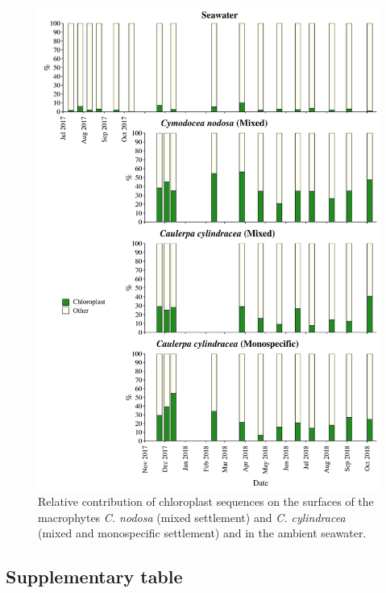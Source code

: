 \documentclass[12pt,]{article}
\begin{document}
\begin{figure}[H]

{\centering \includegraphics[width=0.85\linewidth]{../results/figures/chloroplast_bar_plot} 

}

\caption{Relative contribution of chloroplast sequences on the surfaces of the macrophytes \textit{C. nodosa} (mixed settlement) and \textit{C. cylindracea} (mixed and monospecific settlement) and in the ambient seawater.\label{chloroplast}}\label{fig:unnamed-chunk-3}
\end{figure}

\hypertarget{supplementary-table}{%
\subsection{Supplementary table}\label{supplementary-table}}

\begingroup\fontsize{9}{11}\selectfont
\end{document}
